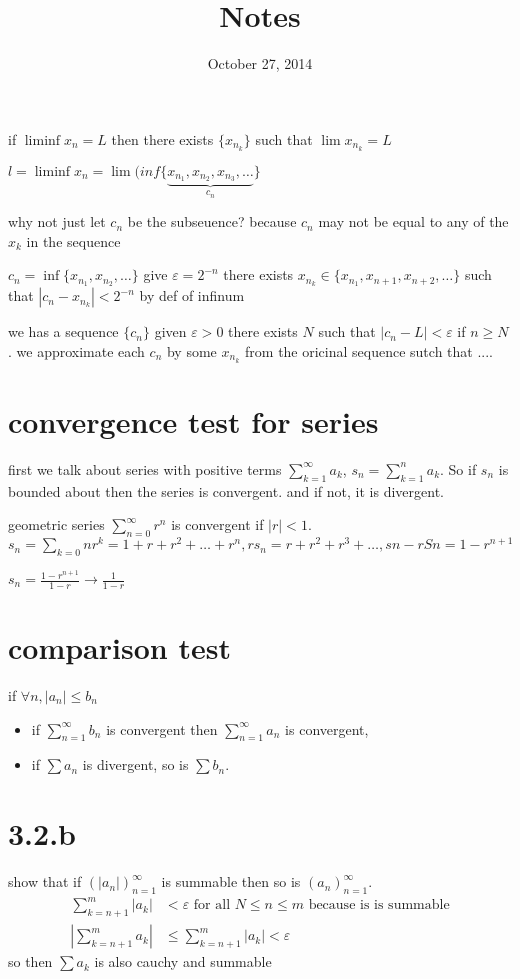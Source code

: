 \documentclass[letterpaper]{article}
\begin{document}
\title{Notes}
\date{October 27, 2014}
\maketitle
if $\liminf x_n=L$ then there exists $\{x_{n_k}\}$ such that $\lim x_{n_k}=L$

$l=\liminf x_n=\lim(inf\{\underbrace{x_{n_1},x_{n_2},x_{n_3},\dots}_{c_n}\}$

why not just let $c_n$ be the subseuence? because $c_n$ may not be equal to any of the $x_k$ in the sequence

$c_n=\inf\{x_{n_1},x_{n_2},\dots\}$ give $\varepsilon=2^{-n}$ there exists $x_{n_k}\in\{x_{n_1},x_{n+1},x_{n+2},\dots\}$ such that $\left\lvert c_n-x_{n_k}\right\rvert<2^{-n}$ by def of infinum

we has a sequence $\{c_n\}$ given $\varepsilon>0$ there exists $N$ such that $\left\lvert c_n-L\right\rvert<\varepsilon$ if $n\ge N$. we approximate each $c_n$ by some $x_{n_k}$ from the oricinal sequence sutch that ....

\section*{convergence test for series}
first we talk about series with positive terms $\sum\limits_{k=1}^\infty{a_k}$, $s_n=\sum\limits_{k=1}^n{a_k}$. So if $s_n$ is bounded about then the series is convergent. and if not, it is divergent.

geometric series $\sum\limits_{n=0}^\infty{r^n}$ is convergent if $\left\lvert r\right\rvert<1$. $s_n=\sum\limits_{k=0}n{r^k}=1+r+r^2+\dots+r^n, rs_n=r+r^2+r^3+\dots, sn-rSn=1-r^{n+1}$

$s_n=\frac{1-r^{n+1}}{1-r}\to\frac{1}{1-r}$


\section*{comparison test}
if $\forall n, |a_n|\le b_n$
\begin{itemize}
\item
  if $\sum\limits_{n=1}^\infty{b_n}$ is convergent then $\sum\limits_{n=1}^\infty{a_n}$ is convergent,
  \item
  if $\sum\limits{a_n}$ is divergent, so is $\sum\limits{b_n}$.
\end{itemize}
\section*{3.2.b}
show that if $\left(|a_n|\right)_{n=1}^\infty$ is summable then so is $\left(a_n\right)_{n=1}^\infty$.
\begin{align*}
  \sum\limits_{k=n+1}^m{|a_k|}&<\varepsilon\text{ for all }N\le n\le m \text{ because is is summable}\\
  \left\lvert\sum\limits_{k=n+1}^m{a_k}\right\rvert&\le\sum\limits_{k=n+1}^m{|a_k|}<\varepsilon
\end{align*}
so then $\sum\limits{a_k}$ is also cauchy and summable
\end{document}
